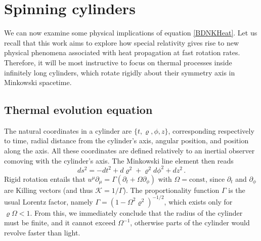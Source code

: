 \documentclass[a4paper, amsfonts, amssymb, amsmath, reprint, showkeys, nofootinbib, twoside, onecolumn,notitlepage]{revtex4-1}
\newcommand{\K}{{\mathcal{K}}}
\theoremstyle{definition}
\theoremstyle{theorem}
\begin{document}
\section{Spinning cylinders}

We can now examine some physical implications of equation \eqref{BDNKHeat}. Let us recall that this work aims to explore how special relativity gives rise to new physical phenomena associated with heat propagation at fast rotation rates. Therefore, it will be most instructive to focus on thermal processes inside infinitely long cylinders, which rotate rigidly about their symmetry axis in Minkowski spacetime.

\subsection{Thermal evolution equation}

The natural coordinates in a cylinder are $\{t, \varrho, \phi, z\}$, corresponding respectively to time, radial distance from the cylinder's axis, angular position, and position along the axis. All these coordinates are defined relatively to an inertial observer comoving with the cylinder's axis. The Minkowski line element then reads
\begin{equation}
ds^2 =-dt^2+d\varrho^2 +\varrho^2 d\phi^2 +dz^2 \, .
\end{equation}
Rigid rotation entails that
$u^\mu \partial_\mu =\Gamma(\partial_t+\Omega\partial_\phi)$ with $\Omega=\text{const}$, since $\partial_t$ and $\partial_\phi$ are Killing vectors (and thus $\K=1/\Gamma$). The proportionality function $\Gamma$ is the usual Lorentz factor, namely $\Gamma=(1-\Omega^2\varrho^2)^{-1/2}$, which exists only for $\varrho \Omega<1$. From this, we immediately conclude that the radius of the cylinder must be finite, and it cannot exceed $\Omega^{-1}$, otherwise parts of the cylinder would revolve faster than light. 
\end{document}
